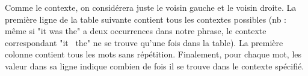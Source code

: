 \documentclass[11pt, a4paper]{report}
\begin{document}
\begin{center}
                                                                                                                                                                                                                                                                                                                                                                                                                                                                                                                                                                                                                                                                                                                                                                                                                                                                                                                                                                                                                                                                                                                                                                                                                                                                                                                                                                                                                                                                                                                                                                                                                                                                                                                                                                                                                                                                                                                                                             
\end{center}
Comme le contexte, on considérera juste le voisin gauche et le voisin droite. La 
première ligne de la table suivante contient tous les contextes possibles (nb : même si 
"it was the" a deux occurrences dans notre phrase, le contexte correspondant "it \textunderscore \ the" 
ne se trouve qu'une fois dans la table). La première colonne contient tous les mots sans répétition.
Finalement, pour chaque mot, les valeur dans sa ligne indique combien de fois il se trouve dans le contexte
spécifié.  
\end{document}
